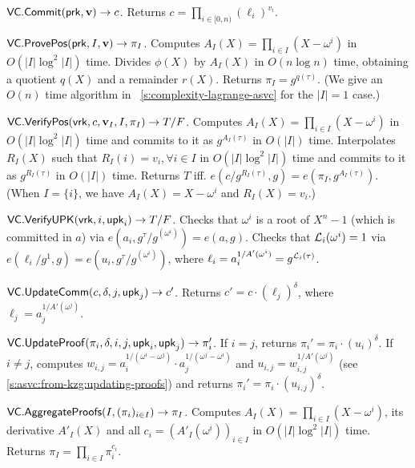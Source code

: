 \api $\mathsf{VC}.\mathsf{Commit}(\mathsf{prk}, \bm{\mathrm{v}}) \rightarrow c$. %
Returns $c=\prod_{i\in[0,n)} (\ell_i)^{v_i}$.

\api $\mathsf{VC}.\mathsf{ProvePos}(\mathsf{prk}, I, \bm{\mathrm{v}}) \rightarrow \pi_I$.
Computes $A_I(X)=\prod_{i\in I} (X-\omega^i)$ in $O(\vert I\vert \log^2{\vert I \vert})$ time.
Divides $\phi(X)$ by $A_I(X)$ in $O(n\log{n})$ time, obtaining a quotient $q(X)$ and a remainder $r(X)$.
Returns $\pi_I = g^{q(\tau)}$.
(We give an $O(n)$ time algorithm in \ifCameraReady~\cite[Appendix D.7]{TAB+20e}\else\cref{s:complexity-lagrange-asvc}\fi\xspace for the $\vert I\vert = 1$ case.)

\api $\mathsf{VC}.\mathsf{VerifyPos}(\mathsf{vrk}, c, \bm{\mathrm{v}}_I, I, \pi_I) \rightarrow T/F$.
Computes $A_I(X)=\prod_{i\in I} (X-\omega^i)$ in $O(\vert I\vert \log^2{\vert I \vert})$ time and commits to it as $g^{A_I(\tau)}$ in $O(\vert I \vert)$ time.
Interpolates $R_I(X)$ such that $R_I(i) = v_i,\forall i \in I$ in $O(\vert I\vert \log^2{\vert I \vert})$ time and commits to it as $g^{R_I(\tau)}$ in $O(\vert I \vert)$ time.
Returns $T$ iff. $e(c/g^{R_I(\tau)},g)=e(\pi_I, g^{A_I(\tau)})$.
(When $I=\{i\}$, we have $A_I(X)=X-\omega^i$ and $R_I(X)=v_i$.)

\api $\mathsf{VC}.\mathsf{VerifyUPK}(\mathsf{vrk},i, \mathsf{upk}_i) \rightarrow T/F$.
Checks that $\omega^i$ is a root of $X^n-1$ (which is committed in $a$) via $e(a_i, g^\tau/g^{(\omega^i)}) = e(a,g)$.
Checks that $\mathcal{L}_i(\omega^i) = 1$ via $e(\ell_i/g^1, g) =e(u_i,g^\tau/g^{(\omega^i)})$, where $\ell_i=a_i^{1/A'(\omega^i)}=g^{\mathcal{L}_i(\tau)}$.

\api $\mathsf{VC}.\mathsf{UpdateComm}(c, \delta, j,\mathsf{upk}_j)\rightarrow c'$.
Returns $c'=c\cdot (\ell_j)^\delta$, where $\ell_j=a_j^{1/A'(\omega^j)}$.

\api $\mathsf{VC}.\mathsf{UpdateProof}(\pi_i, \delta, i,j, \mathsf{upk}_i, \mathsf{upk}_j)\rightarrow \pi'_i$.
If $i=j$, returns $\pi_i'=\pi_i \cdot (u_i)^\delta$.
If $i\ne j$, computes $w_{i,j}=a_i^{1/(\omega^i - \omega^j)}\cdot a_j^{1/(\omega^j - \omega^i)}$ and $u_{i,j}=w_{i,j}^{1/A'(\omega^j)}$ (see \cref{s:asvc:from-kzg:updating-proofs}) and returns $\pi_i'=\pi_i \cdot (u_{i,j})^\delta$.

\api $\mathsf{VC}.\mathsf{AggregateProofs}(I, (\pi_i)_{i\in I})\rightarrow \pi_I$.
Computes $A_I(X)=\prod_{i\in I} (X-\omega^i)$, its derivative $A'_I(X)$ and all $c_i = (A'_I(\omega^i))_{i\in I}$ in $O(\vert I\vert \log^2{\vert I \vert})$ time.
Returns $\pi_I = \prod_{i\in I} \pi_i^{c_i}$.

